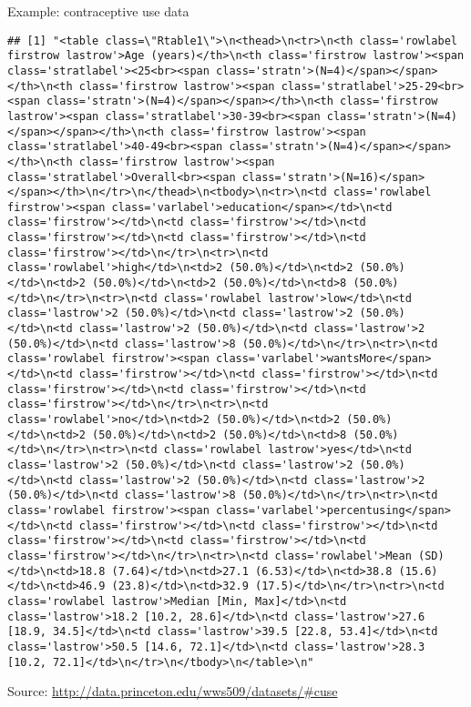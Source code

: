 \documentclass[
  ignorenonframetext,
]{beamer}
\begin{document}
\begin{frame}[fragile]{Example: contraceptive use data}
\protect\hypertarget{example-contraceptive-use-data}{}

\tiny

\begin{verbatim}
## [1] "<table class=\"Rtable1\">\n<thead>\n<tr>\n<th class='rowlabel firstrow lastrow'>Age (years)</th>\n<th class='firstrow lastrow'><span class='stratlabel'><25<br><span class='stratn'>(N=4)</span></span></th>\n<th class='firstrow lastrow'><span class='stratlabel'>25-29<br><span class='stratn'>(N=4)</span></span></th>\n<th class='firstrow lastrow'><span class='stratlabel'>30-39<br><span class='stratn'>(N=4)</span></span></th>\n<th class='firstrow lastrow'><span class='stratlabel'>40-49<br><span class='stratn'>(N=4)</span></span></th>\n<th class='firstrow lastrow'><span class='stratlabel'>Overall<br><span class='stratn'>(N=16)</span></span></th>\n</tr>\n</thead>\n<tbody>\n<tr>\n<td class='rowlabel firstrow'><span class='varlabel'>education</span></td>\n<td class='firstrow'></td>\n<td class='firstrow'></td>\n<td class='firstrow'></td>\n<td class='firstrow'></td>\n<td class='firstrow'></td>\n</tr>\n<tr>\n<td class='rowlabel'>high</td>\n<td>2 (50.0%)</td>\n<td>2 (50.0%)</td>\n<td>2 (50.0%)</td>\n<td>2 (50.0%)</td>\n<td>8 (50.0%)</td>\n</tr>\n<tr>\n<td class='rowlabel lastrow'>low</td>\n<td class='lastrow'>2 (50.0%)</td>\n<td class='lastrow'>2 (50.0%)</td>\n<td class='lastrow'>2 (50.0%)</td>\n<td class='lastrow'>2 (50.0%)</td>\n<td class='lastrow'>8 (50.0%)</td>\n</tr>\n<tr>\n<td class='rowlabel firstrow'><span class='varlabel'>wantsMore</span></td>\n<td class='firstrow'></td>\n<td class='firstrow'></td>\n<td class='firstrow'></td>\n<td class='firstrow'></td>\n<td class='firstrow'></td>\n</tr>\n<tr>\n<td class='rowlabel'>no</td>\n<td>2 (50.0%)</td>\n<td>2 (50.0%)</td>\n<td>2 (50.0%)</td>\n<td>2 (50.0%)</td>\n<td>8 (50.0%)</td>\n</tr>\n<tr>\n<td class='rowlabel lastrow'>yes</td>\n<td class='lastrow'>2 (50.0%)</td>\n<td class='lastrow'>2 (50.0%)</td>\n<td class='lastrow'>2 (50.0%)</td>\n<td class='lastrow'>2 (50.0%)</td>\n<td class='lastrow'>8 (50.0%)</td>\n</tr>\n<tr>\n<td class='rowlabel firstrow'><span class='varlabel'>percentusing</span></td>\n<td class='firstrow'></td>\n<td class='firstrow'></td>\n<td class='firstrow'></td>\n<td class='firstrow'></td>\n<td class='firstrow'></td>\n</tr>\n<tr>\n<td class='rowlabel'>Mean (SD)</td>\n<td>18.8 (7.64)</td>\n<td>27.1 (6.53)</td>\n<td>38.8 (15.6)</td>\n<td>46.9 (23.8)</td>\n<td>32.9 (17.5)</td>\n</tr>\n<tr>\n<td class='rowlabel lastrow'>Median [Min, Max]</td>\n<td class='lastrow'>18.2 [10.2, 28.6]</td>\n<td class='lastrow'>27.6 [18.9, 34.5]</td>\n<td class='lastrow'>39.5 [22.8, 53.4]</td>\n<td class='lastrow'>50.5 [14.6, 72.1]</td>\n<td class='lastrow'>28.3 [10.2, 72.1]</td>\n</tr>\n</tbody>\n</table>\n"
\end{verbatim}

Source: \url{http://data.princeton.edu/wws509/datasets/\#cuse}

\end{frame}
\end{document}
